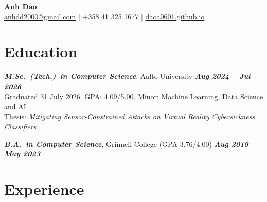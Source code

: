 \documentclass[11pt,a4paper]{article}
\begin{document}
\begin{center}
    {\LARGE\bfseries Anh Dao}\\[4pt]
    \href{mailto:anhdd2000@gmail.com}{anhdd2000@gmail.com} $\vert$
    +358 41 325 1677 $\vert$
    \href{https://daoa0601.github.io/}{daoa0601.github.io}
\end{center}

\section{Education}

\noindent\textbf{\textit{M.Sc.\ (Tech.)\ in Computer Science}}, Aalto University \hfill \textbf{\textit{Aug 2024 -- Jul 2026}}\\
Graduated 31 July 2026. GPA: 4.09/5.00. Minor: Machine Learning, Data Science and AI\\
Thesis: \textit{Mitigating Sensor-Constrained Attacks on Virtual Reality Cybersickness Classifiers}

\vspace{4pt}

\noindent\textbf{\textit{B.A.\ in Computer Science}}, Grinnell College (GPA 3.76/4.00) \hfill \textbf{\textit{Aug 2019 -- May 2023}}

\section{Experience}
\end{document}
